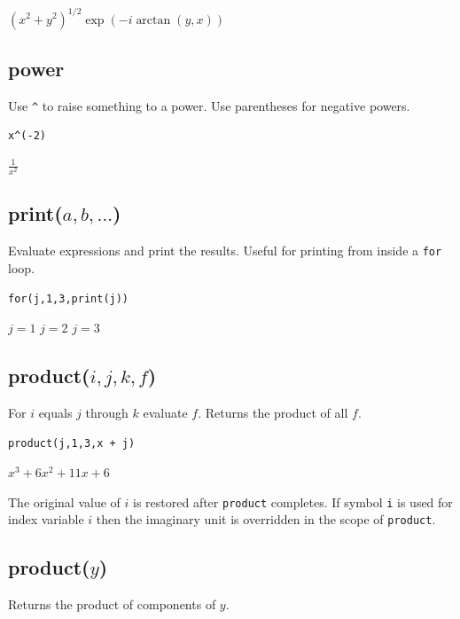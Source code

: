\documentclass[12pt]{article}
\begin{document}
\noindent
$\displaystyle (x^2+y^2)^{1/2}\exp(-i\arctan(y,x))$

\subsection*{power}

Use \verb$^$ to raise something to a power.
Use parentheses for negative powers.

{\color{blue}
\begin{verbatim}
x^(-2)
\end{verbatim}
}

\noindent
$\displaystyle \frac{1}{x^2}$

\subsection*{print($a,b,\ldots$)}

Evaluate expressions and print the results.
Useful for printing from inside a {\tt for} loop.

{\color{blue}
\begin{verbatim}
for(j,1,3,print(j))
\end{verbatim}
}

\noindent
$j=1$\newline
$j=2$\newline
$j=3$

\subsection*{product($i,j,k,f$)}

For $i$ equals $j$ through $k$ evaluate $f$.
Returns the product of all $f$.

{\color{blue}
\begin{verbatim}
product(j,1,3,x + j)
\end{verbatim}
}

\noindent
$\displaystyle x^3+6x^2+11x+6$

\bigskip
\noindent
The original value of $i$ is restored after {\tt product} completes.
If symbol {\tt i} is used for index variable $i$
then the imaginary unit is overridden in the scope of {\tt product}.

\subsection*{product($y$)}

Returns the product of components of $y$.
\end{document}
